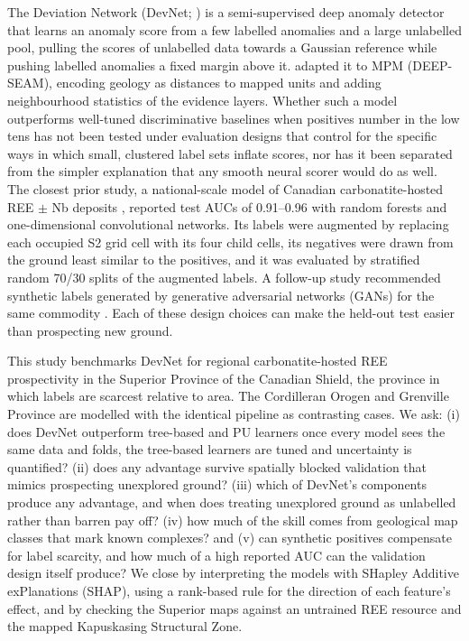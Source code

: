 \documentclass[pdflatex,sn-apa]{sn-jnl}
\begin{document}
The Deviation Network (DevNet; \citealp{Pang2019}) is a semi-supervised deep anomaly detector that learns an anomaly score from a few labelled anomalies and a large unlabelled pool, pulling the scores of unlabelled data towards a Gaussian reference while pushing labelled anomalies a fixed margin above it. \citet{Luo2026} adapted it to MPM (DEEP-SEAM), encoding geology as distances to mapped units and adding neighbourhood statistics of the evidence layers. Whether such a model outperforms well-tuned discriminative baselines when positives number in the low tens has not been tested under evaluation designs that control for the specific ways in which small, clustered label sets inflate scores, nor has it been separated from the simpler explanation that any smooth neural scorer would do as well. The closest prior study, a national-scale model of Canadian carbonatite-hosted REE $\pm$ Nb deposits \citep{Parsa2024}, reported test AUCs of 0.91--0.96 with random forests and one-dimensional convolutional networks. Its labels were augmented by replacing each occupied S2 grid cell with its four child cells, its negatives were drawn from the ground least similar to the positives, and it was evaluated by stratified random 70/30 splits of the augmented labels. A follow-up study recommended synthetic labels generated by generative adversarial networks (GANs) for the same commodity \citep{Parsa2025}. Each of these design choices can make the held-out test easier than prospecting new ground.

This study benchmarks DevNet for regional carbonatite-hosted REE prospectivity in the Superior Province of the Canadian Shield, the province in which labels are scarcest relative to area. The Cordilleran Orogen and Grenville Province are modelled with the identical pipeline as contrasting cases. We ask: (i) does DevNet outperform tree-based and PU learners once every model sees the same data and folds, the tree-based learners are tuned and uncertainty is quantified? (ii) does any advantage survive spatially blocked validation that mimics prospecting unexplored ground? (iii) which of DevNet's components produce any advantage, and when does treating unexplored ground as unlabelled rather than barren pay off? (iv) how much of the skill comes from geological map classes that mark known complexes? and (v) can synthetic positives compensate for label scarcity, and how much of a high reported AUC can the validation design itself produce? We close by interpreting the models with SHapley Additive exPlanations (SHAP), using a rank-based rule for the direction of each feature's effect, and by checking the Superior maps against an untrained REE resource and the mapped Kapuskasing Structural Zone.
\end{document}
